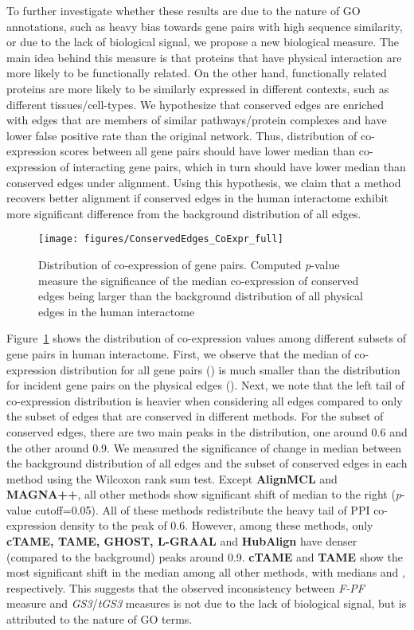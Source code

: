 \documentclass[10pt, journal, compsoc, final]{IEEEtran}
\begin{document}
To further investigate whether these results are due to the nature of GO annotations, such as heavy bias towards gene pairs with high sequence similarity,  or due to the lack of biological signal, we propose a new biological measure. The main idea behind this measure is that proteins that have physical interaction are more likely to be functionally related. On the other hand, functionally related proteins are more likely to be similarly expressed in different contexts, such as different tissues/cell-types. We hypothesize that conserved edges are enriched with edges that are members of similar pathways/protein complexes and have lower false positive rate than the original network. Thus, distribution of co-expression scores between all gene pairs should have lower median than co-expression of interacting gene pairs, which in turn should have lower median than conserved edges under alignment. Using this hypothesis, we claim that a method recovers better alignment if conserved edges in the human interactome exhibit more significant difference from the background distribution of all edges.


\begin{figure}[!t]
\centering
\texttt{[image: figures/ConservedEdges\_CoExpr\_full]}
\caption{Distribution of co-expression of gene pairs. Computed \emph{p}-value measure the significance of the median co-expression of conserved edges being larger than the background distribution of all physical edges in the human interactome}
\label{fig:CoExp}
\end{figure}

Figure~\ref{fig:CoExp} shows the distribution of co-expression values among different subsets of gene pairs in human interactome. First, we observe that the median of co-expression distribution for all gene pairs () is much smaller than the distribution for incident gene pairs on the physical edges (). Next, we note that the left tail of co-expression distribution is heavier when considering all edges compared to only the subset of edges that are conserved in different methods.
For the subset of conserved edges, there are two main peaks in the distribution, one around 0.6 and the other around 0.9. We measured the significance of change in median between the background distribution of all edges and the subset of conserved edges in each method using the Wilcoxon rank sum test. Except \textbf{AlignMCL} and \textbf{MAGNA++}, all other methods show significant shift of median to the right (\emph{p}-value cutoff=0.05). All of these methods redistribute the heavy tail of PPI co-expression density to the peak of 0.6. However, among these methods, only \textbf{cTAME, TAME, GHOST, L-GRAAL} and \textbf{HubAlign} have denser (compared to the background) peaks around 0.9. \textbf{cTAME} and \textbf{TAME} show the most significant shift in the median among all other methods, with medians  and   , respectively. This suggests that the observed inconsistency between \textit{F-PF} measure and \textit{GS3}/\textit{tGS3} measures is not due to the lack of biological signal, but is attributed to the nature of GO terms.
\end{document}
